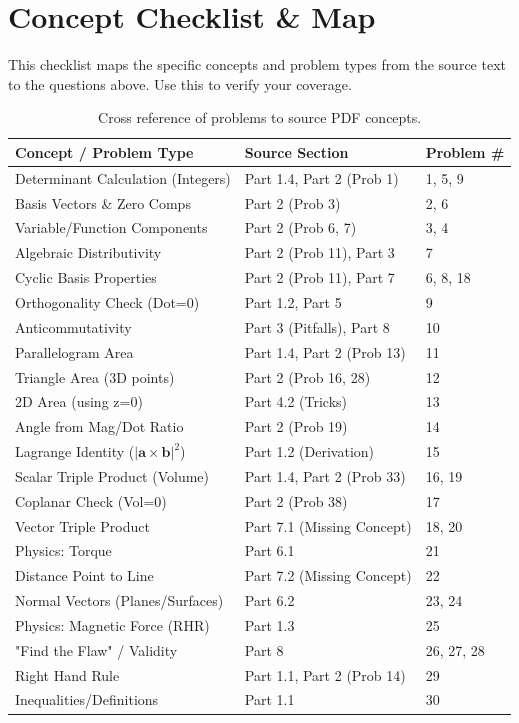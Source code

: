 \documentclass[11pt]{article}
\begin{document}
\newpage

\section*{Concept Checklist \& Map}

This checklist maps the specific concepts and problem types from the source text to the questions above. Use this to verify your coverage.

\begin{table}[h]
\centering
\begin{tabular}{|l|l|l|}
\hline
\textbf{Concept / Problem Type} & \textbf{Source Section} & \textbf{Problem \#} \\ \hline
Determinant Calculation (Integers) & Part 1.4, Part 2 (Prob 1) & 1, 5, 9 \\ \hline
Basis Vectors \& Zero Comps & Part 2 (Prob 3) & 2, 6 \\ \hline
Variable/Function Components & Part 2 (Prob 6, 7) & 3, 4 \\ \hline
Algebraic Distributivity & Part 2 (Prob 11), Part 3 & 7 \\ \hline
Cyclic Basis Properties & Part 2 (Prob 11), Part 7 & 6, 8, 18 \\ \hline
Orthogonality Check (Dot=0) & Part 1.2, Part 5 & 9 \\ \hline
Anticommutativity & Part 3 (Pitfalls), Part 8 & 10 \\ \hline
Parallelogram Area & Part 1.4, Part 2 (Prob 13) & 11 \\ \hline
Triangle Area (3D points) & Part 2 (Prob 16, 28) & 12 \\ \hline
2D Area (using z=0) & Part 4.2 (Tricks) & 13 \\ \hline
Angle from Mag/Dot Ratio & Part 2 (Prob 19) & 14 \\ \hline
Lagrange Identity ($|\mathbf{a}\times\mathbf{b}|^2$) & Part 1.2 (Derivation) & 15 \\ \hline
Scalar Triple Product (Volume) & Part 1.4, Part 2 (Prob 33) & 16, 19 \\ \hline
Coplanar Check (Vol=0) & Part 2 (Prob 38) & 17 \\ \hline
Vector Triple Product & Part 7.1 (Missing Concept) & 18, 20 \\ \hline
Physics: Torque & Part 6.1 & 21 \\ \hline
Distance Point to Line & Part 7.2 (Missing Concept) & 22 \\ \hline
Normal Vectors (Planes/Surfaces) & Part 6.2 & 23, 24 \\ \hline
Physics: Magnetic Force (RHR) & Part 1.3 & 25 \\ \hline
"Find the Flaw" / Validity & Part 8 & 26, 27, 28 \\ \hline
Right Hand Rule & Part 1.1, Part 2 (Prob 14) & 29 \\ \hline
Inequalities/Definitions & Part 1.1 & 30 \\ \hline
\end{tabular}
\caption{Cross reference of problems to source PDF concepts.}
\end{table}
\end{document}
